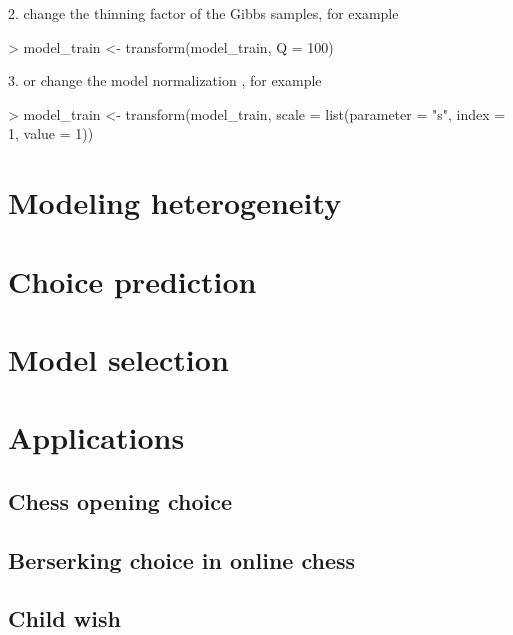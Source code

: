 \documentclass[article]{jss}
\begin{document}
2. change the thinning factor  of the Gibbs samples, for example
\begin{Schunk}
\begin{Sinput}
> model_train <- transform(model_train, Q = 100)
\end{Sinput}
\end{Schunk}

3. or change the model normalization , for example
\begin{Schunk}
\begin{Sinput}
> model_train <- transform(model_train, scale = list(parameter = "s", index = 1, value = 1))
\end{Sinput}
\end{Schunk}

\section{Modeling heterogeneity} \label{sec:modeling_heterogeneity}

\section{Choice prediction} \label{sec:choice_prediction}

\section{Model selection} \label{sec:model_selection}


\section{Applications} \label{sec:applications}


\subsection{Chess opening choice} \label{subsec:chess_opening_choice}

\subsection{Berserking choice in online chess} \label{subsec:berserk}

\subsection{Child wish} \label{subsec:child_wish}
\end{document}
